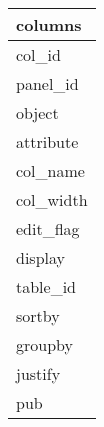 \documentclass{article}
\begin{document}

\begin{tabular}{|l|} \hline
\textbf{columns} \\ \hline
col\_id \\ \hline
panel\_id \\ \hline
object \\ \hline
attribute \\ \hline
col\_name \\ \hline
col\_width \\ \hline
edit\_flag \\ \hline
display \\ \hline
table\_id \\ \hline
sortby \\ \hline
groupby \\ \hline
justify \\ \hline
pub \\ \hline
\end{tabular}
\end{document}
